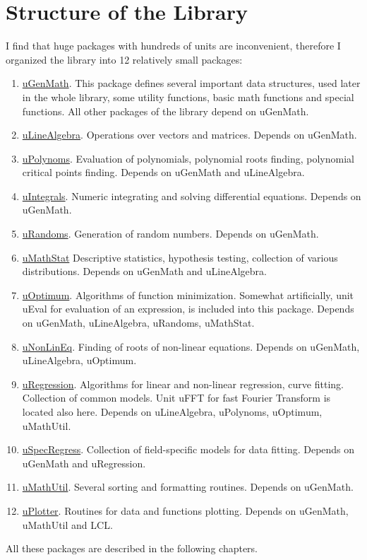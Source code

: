 \documentclass[12pt,a4paper,oneside]{report}
\begin{document}
\chapter{Structure of the Library}
I find that huge packages with hundreds of units are inconvenient, therefore I organized the library into 12 relatively small packages:
\begin{enumerate}
	\item{\hyperref[package-ugenmath]{uGenMath}.} This package defines several important data structures, used later in the whole library, some utility functions, basic math functions and special functions. All other packages of the library depend on uGenMath.
	\item{\hyperref[package-ulinealgebra]{uLineAlgebra}.} Operations over vectors and matrices. Depends on uGenMath.
	\item{\hyperref[package-upolynoms]{uPolynoms}.} Evaluation of polynomials, polynomial roots finding, polynomial critical points finding. Depends on uGenMath and uLineAlgebra.
	\item{\hyperref[package-uintegrals]{uIntegrals}.} Numeric integrating and solving differential equations. Depends on uGenMath.
	\item{\hyperref[package-urandoms]{uRandoms}.} Generation of random numbers. Depends on uGenMath.
	\item{\hyperref[package-umathstat]{uMathStat}} Descriptive statistics, hypothesis testing, collection of various distributions. Depends on uGenMath and uLineAlgebra.
	\item{\hyperref[package-uoptimum]{uOptimum}.} Algorithms of function minimization. Somewhat artificially, unit uEval for evaluation of an expression, is included into this package. Depends on uGenMath, uLineAlgebra, uRandoms, uMathStat.
	\item{\hyperref[package-unonlineq]{uNonLinEq}.} Finding of roots of non-linear equations. Depends on uGenMath, uLineAlgebra, uOptimum.
	\item{\hyperref[package-uregression]{uRegression}.} Algorithms for linear and non-linear regression, curve fitting. Collection of common models. Unit uFFT for fast Fourier Transform is located also here.  Depends on uLineAlgebra, uPolynoms, uOptimum, uMathUtil.
	\item{\hyperref[package-uspecregress]{uSpecRegress}.} Collection of field-specific models for data fitting. Depends on uGenMath and uRegression.
	\item{\hyperref[package-umathutil]{uMathUtil}.} Several sorting and formatting routines. Depends on uGenMath.
	\item{\hyperref[package-uplotter]{uPlotter}.} Routines for data and functions plotting. Depends on uGenMath, uMathUtil and LCL.
\end{enumerate}	
All these packages are described in the following chapters. 
\end{document}
